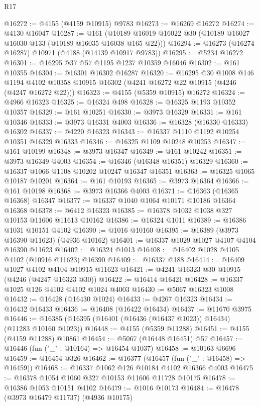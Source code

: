 \begin{lexlean}{R17}
\begin{coremodule}
@16272 := @4155 (@4159 @10915) @9783
@16273 := @16269 @16272
@16274 := @4130 @16047
@16287 := @161
    (@10189 @16019 @16022 @30 (@10189 @16027 @16030 @133 (@10189 @16035 @16038 @165 @22)))
@16294 := @16273 (@16274 @16287) @10971 (@4188 (@14139 @10917 @9783))
@16295 := @5234 @16272
@16301 := @16295 @37 @57 @1195 @1237 @10359 @16046
@16302 := @161 @10355
@16304 := @16301 @16302 @16287
@16320 := @16295
    @30
    @1008
    @146
    @1194
    @4102
    @10358
    @10915
    @16302
    (@4241 @16272 @22 @10915 (@4246 (@4247 @16272 @22)))
@16323 := @4155 (@5359 @10915) @16272
@16324 := @4966 @16323
@16325 := @16324 @498
@16328 := @16325 @1193 @10352 @10357
@16329 := @161 @10251
@16330 := @3973 @16329
@16331 := @161 @10346
@16333 := @3973 @16331 @4003
@16336 := @16328 (@16330 @16333) @16302
@16337 := @4220 @16323
@16343 := @16337 @1110 @1192 @10254 @10351 @16329 @16333
@16346 := @16325 @1109 @10248 @10253
@16347 := @161 @10199
@16348 := @3973 @16347
@16349 := @161 @10242
@16351 := @3973 @16349 @4003
@16354 := @16346 (@16348 @16351) @16329
@16360 := @16337 @1066 @1108 @10202 @10247 @16347 @16351
@16363 := @16325 @1065 @10187 @10201
@16364 := @161 @10193
@16365 := @3973 @16364
@16366 := @161 @10198
@16368 := @3973 @16366 @4003
@16371 := @16363 (@16365 @16368) @16347
@16377 := @16337 @1040 @1064 @10171 @10186 @16364 @16368
@16378 := @6412 @16323
@16385 := @16378 @1032 @1038 @327 @10153 @11606 @11613 @10162
@16386 := @16324 @1011
@16389 := @16386 @1031 @10151 @4102
@16390 := @1016 @10160
@16395 := @16389 (@3973 @16390 @11623) (@4936 @10162)
@16401 := @16337 @1029 @1027 @4107 @4104 @16390 @11623
@16402 := @16324 @1013
@16408 := @16402 @1028 @4105 @4102 (@10916 @11623) @16390
@16409 := @16337 @188
@16414 := @16409 @1027 @4102 @4104 @10915 @11623
@16421 := @4241 @16323 @30 @10915 (@4246 (@4247 @16323 @30))
@16422 := @16414 @16421
@16428 := @16337 @1025 @126 @4102 @4102 @1024 @4003
@16430 := @5067 @16323 @1008
@16432 := @16428 (@16430 @1024)
@16433 := @4267 @16323
@16434 := @16432 @16433
@16436 := @16408 (@16422 @16434)
@16437 := @11670 @3975
@16446 := @16385 (@16395 (@16401 (@16436 (@16437 @1023)) @16434) (@11283 @10160 @1023))
@16448 := @4155 (@5359 @11288)
@16451 := @4155 (@4159 @11288) @10861
@16454 := @5067 (@16448 @16451) @57
@16457 := @16446 (fun ("_" : @10164) => @16454 @1037)
@16458 := @10163 @6696
@16459 := @16454 @326
@16462 := @16377 (@16457 (fun ("_" : @16458) => @16459))
@16468 := @16337 @1062 @126 @10184 @4102 @16366 @4003
@16475 := @16378 @1054 @1060 @327 @10153 @11606 @11728 @10175
@16478 := @16386 @1053 @10151 @4102
@16479 := @1016 @10173
@16484 := @16478 (@3973 @16479 @11737) (@4936 @10175)

\end{coremodule}
\end{lexlean}
